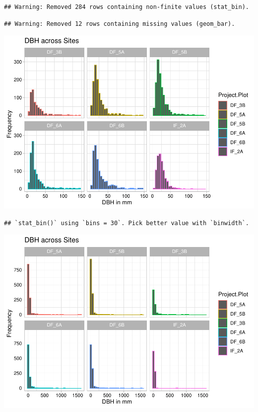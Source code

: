 \documentclass[
  12pt,
]{article}
\begin{document}
\begin{verbatim}
## Warning: Removed 284 rows containing non-finite values (stat_bin).
\end{verbatim}

\begin{verbatim}
## Warning: Removed 12 rows containing missing values (geom_bar).
\end{verbatim}

\includegraphics{GoldenGriffithsKnierMalinowski_ENV872_Project_files/figure-latex/DBH graphs-7.pdf}

\begin{verbatim}
## `stat_bin()` using `bins = 30`. Pick better value with `binwidth`.
\end{verbatim}

\includegraphics{GoldenGriffithsKnierMalinowski_ENV872_Project_files/figure-latex/DBH graphs-8.pdf}
\end{document}
